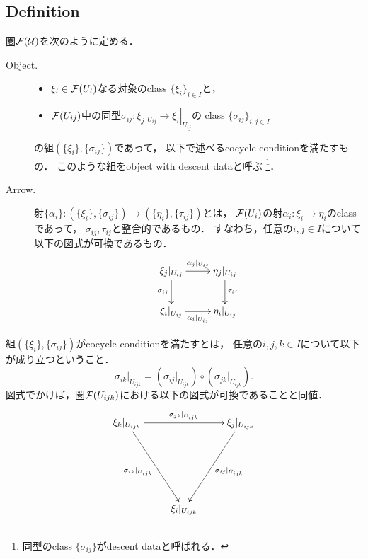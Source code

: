 \documentclass[a4paper]{jsarticle}
\begin{document}
\subsection{Definition}
\begin{Def}
    圏$\mathcal{F}(\mathcal{U})$を次のように定める．
    \begin{description}
        \item[Object.] \hfill \vspace{-0.2cm}
            \begin{itemize}
                \item $\xi_i \in \mathcal{F}(U_i)$なる対象のclass $\{\xi_i\}_{i \in I}$と，
                \item
                    $\mathcal{F}(U_{ij})$中の同型$\sigma_{ij} \colon \xi_j|_{U_{ij}} \to \xi_i|_{U_{ij}}$の
                    class $\{\sigma_{ij}\}_{i,j \in I}$
            \end{itemize}
            の組$(\{\xi_i\}, \{\sigma_{ij}\})$であって，
            以下で述べるcocycle conditionを満たすもの．
            このような組をobject with descent dataと呼ぶ
            \footnote{ 同型のclass $\{\sigma_{ij}\}$がdescent dataと呼ばれる． }．

        \item[Arrow.] \mnewline
            射$\{\alpha_i\} \colon (\{\xi_i\}, \{\sigma_{ij}\}) \to (\{\eta_i\}, \{\tau_{ij}\})$とは，
            $\mathcal{F}(U_i)$の射$\alpha_i \colon \xi_i \to \eta_i$のclassであって，\mnewline
            $\sigma_{ij}, \tau_{ij}$と整合的であるもの．
            すなわち，任意の$i, j \in I$について以下の図式が可換であるもの．
            \[\xymatrix{
                \ar[d]_-{\sigma_{ij}} \xi_j|_{U_{ij}} \ar[r]^-{\alpha_j|_{U_{ij}}}&
                \eta_j|_{U_{ij}} \ar[d]^-{\tau_{ij}}\\
                 \xi_i|_{U_{ij}} \ar[r]_-{\alpha_i|_{U_{ij}}}& \eta_i|_{U_{ij}}
            }\]
    \end{description}

    組$(\{\xi_i\}, \{\sigma_{ij}\})$がcocycle conditionを満たすとは，
    任意の$i,j,k \in I$について以下が成り立つということ．
    \[ \sigma_{ik}|_{U_{ijk}}=(\sigma_{ij}|_{U_{ijk}}) \circ (\sigma_{jk}|_{U_{ijk}}). \]
    図式でかけば，圏$\mathcal{F}(U_{ijk})$における以下の図式が可換であることと同値．
    \[\xymatrix@R=70pt{
         \xi_k|_{U_{ijk}} \ar[rd]_-{\sigma_{ik}|_{U_{ijk}}} \ar[rr]^-{\sigma_{jk}|_{U_{ijk}}}
            & {}
            & \xi_j|_{U_{ijk}} \ar[ld]^-{\sigma_{ij}|_{U_{ijk}}} \\
        {} & \xi_i|_{U_{ijk}} & {}
    }\]
\end{Def}
\end{document}
